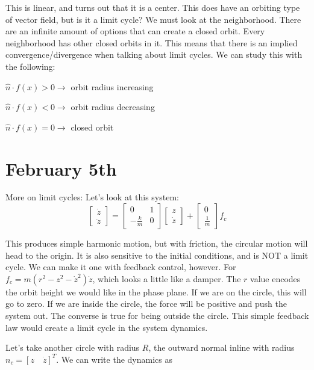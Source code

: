 \documentclass[11pt]{article}
\begin{document}
This is linear, and turns out that it is a center. This does have an orbiting type of vector field, but is it a limit cycle? We must look at the neighborhood. There are an infinite amount of options that can create a closed orbit. Every neighborhood has other closed orbits in it. This means that there is an implied convergence/divergence when talking about limit cycles. We can study this with the following:

$\hat{n} \cdot f(x) >0 \rightarrow $ orbit radius increasing

$\hat{n} \cdot f(x) <0 \rightarrow $ orbit radius decreasing

$\hat{n} \cdot f(x) =0 \rightarrow $ closed orbit




\section*{February 5th}
More on limit cycles:
Let's look at this system:
\begin{equation}
\begin{bmatrix}
\dot{z} \\
\ddot{z}
\end{bmatrix}
=
\begin{bmatrix}
0 &1 \\
-\frac{k}{m} &0
\end{bmatrix}
\begin{bmatrix}
{z} \\
\dot{z}
\end{bmatrix}
+
\begin{bmatrix}
0 \\
\frac{1}{m}
\end{bmatrix}
f_c
\end{equation}

This produces simple harmonic motion, but with friction, the circular motion will head to the origin. It is also sensitive to the initial conditions, and is NOT a limit cycle. We can make it one with feedback control, however.
For $f_c = m(r^2 -z^2 - \dot{z}^2)\dot{z}$, which looks a little like a damper. The $r$ value encodes the orbit height we would like in the phase plane. If we are on the circle, this will go to zero. If we are inside the circle, the force will be positive and push the system out. The converse is true for being outside the circle. This simple feedback law would create a limit cycle in the system dynamics.

Let's take another circle with radius $R$, the outward normal inline with radius $n_c = [z \quad \dot{z}]^T$. We can write the dynamics as 
\end{document}
